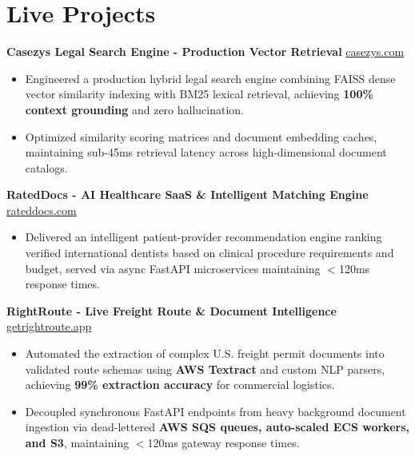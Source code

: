 \documentclass[9.5pt,a4paper]{article}
\begin{document}
\section*{Live Projects}
\noindent
\textbf{Casezys Legal Search Engine - Production Vector Retrieval} \hfill \href{https://casezys.com}{casezys.com}
\begin{itemize}
    \item Engineered a production hybrid legal search engine combining FAISS dense vector similarity indexing with BM25 lexical retrieval, achieving \textbf{100\% context grounding} and zero hallucination.
    \item Optimized similarity scoring matrices and document embedding caches, maintaining sub-45ms retrieval latency across high-dimensional document catalogs.
\end{itemize}
\vspace{0.6pt}
\noindent
\textbf{RatedDocs - AI Healthcare SaaS \& Intelligent Matching Engine} \hfill \href{https://rateddocs.com}{rateddocs.com}
\begin{itemize}
    \item Delivered an intelligent patient-provider recommendation engine ranking verified international dentists based on clinical procedure requirements and budget, served via async FastAPI microservices maintaining $<$120ms response times.
\end{itemize}
\vspace{0.6pt}
\noindent
\textbf{RightRoute - Live Freight Route & Document Intelligence} \hfill \href{https://getrightroute.app}{getrightroute.app}
\begin{itemize}
    \item Automated the extraction of complex U.S. freight permit documents into validated route schemas using \textbf{AWS Textract} and custom NLP parsers, achieving \textbf{99\% extraction accuracy} for commercial logistics.
    \item Decoupled synchronous FastAPI endpoints from heavy background document ingestion via dead-lettered \textbf{AWS SQS queues, auto-scaled ECS workers, and S3}, maintaining $<$120ms gateway response times.
\end{itemize}
\vspace{0.6pt}
\end{document}
